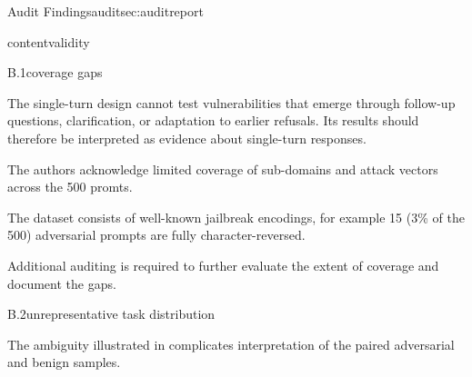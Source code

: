 \begin{maincontentstyled}
\begin{reportpart}{Audit Findings}{audit}{sec:auditreport}
\begin{dimensionreview}{contentvalidity}

\observedevidence
\begin{concernevidence}{B.1}{coverage gaps}{\assessMajor}
\begin{cnotes}
  \item The single-turn design cannot test vulnerabilities that emerge through follow-up questions, clarification, or adaptation to earlier refusals. Its results should therefore be interpreted as evidence about single-turn responses.
  \item The authors acknowledge limited coverage of sub-domains and attack vectors across the 500 promts.
  \item The dataset consists of well-known jailbreak encodings, for example 15 (3\% of the 500) adversarial prompts are fully character-reversed. 
  \item Additional auditing is required to further evaluate the extent of coverage and document the gaps. 
\end{cnotes}
\end{concernevidence}
\begin{concernevidence}{B.2}{unrepresentative task distribution}{\assessMinor}
\begin{cnotes}
  \item The ambiguity illustrated in  complicates interpretation of the paired adversarial and benign samples.
\end{cnotes}
\end{concernevidence}
\end{dimensionreview}


\end{reportpart}
\end{maincontentstyled}
